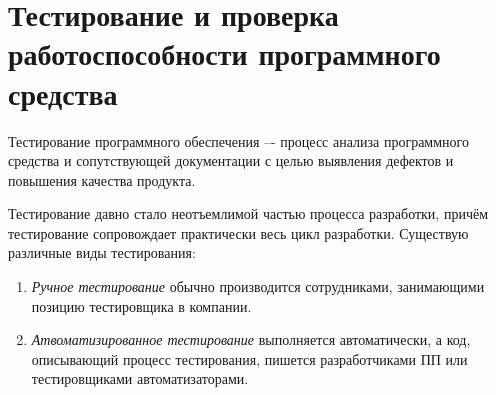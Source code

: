 \section{Тестирование и проверка работоспособности программного средства}
\label{sec:testing}

Тестирование программного обеспечения –- процесс анализа программного средства и сопутствующей документации с целью выявления дефектов и повышения качества продукта. \cite{kulikov_testing}

Тестирование давно стало неотъемлимой частью процесса разработки, причём тестирование сопровождает практически весь цикл разработки. Существую различные виды тестирования:
\begin{enumerate}
	\item \textit{Ручное тестирование} обычно производится сотрудниками, занимающими позицию тестировщика в компании.
	\item \textit{Атвоматизированное тестирование} выполняется автоматически, а код, описывающий процесс тестирования, пишется разработчиками ПП или тестировщиками автоматизаторами.
\end{enumerate}